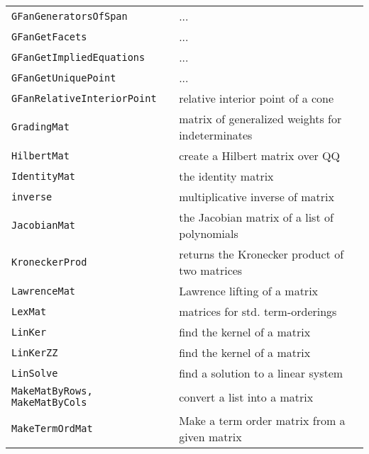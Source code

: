\documentclass[a4paper]{mybook}
\begin{document}
\begin{center}
\begin{longtable}{ll}
{\verb~GFanGeneratorsOfSpan~} &
      ...\\
   
{\verb~GFanGetFacets~} &
      ...\\
   
{\verb~GFanGetImpliedEquations~} &
      ...\\
   
{\verb~GFanGetUniquePoint~} &
      ...\\
   
{\verb~GFanRelativeInteriorPoint~} &
      relative interior point of a cone\\
   
{\verb~GradingMat~} &
      matrix of generalized weights for indeterminates\\
   
{\verb~HilbertMat~} &
      create a Hilbert matrix over QQ\\
   
{\verb~IdentityMat~} &
      the identity matrix\\
   
{\verb~inverse~} &
      multiplicative inverse of matrix\\
   
{\verb~JacobianMat~} &
      the Jacobian matrix of a list of polynomials\\
   
{\verb~KroneckerProd~} &
      returns the Kronecker product of two matrices\\
   
{\verb~LawrenceMat~} &
      Lawrence lifting of a matrix\\
   
{\verb~LexMat~} &
      matrices for std. term-orderings\\
   
{\verb~LinKer~} &
      find the kernel of a matrix\\
   
{\verb~LinKerZZ~} &
      find the kernel of a matrix\\
   
{\verb~LinSolve~} &
      find a solution to a linear system\\
   
{\verb~MakeMatByRows, MakeMatByCols~} &
      convert a list into a matrix\\
   
{\verb~MakeTermOrdMat~} &
      Make a term order matrix from a given matrix\\
   

\end{longtable}
\end{center}
\end{document}
